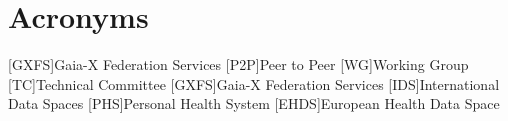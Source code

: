 \chapter{Acronyms}
\begin{acronym}
    [GXFS]{Gaia-X Federation Services}
    [P2P]{Peer to Peer}
    [WG]{Working Group}
    [TC]{Technical Committee}
    [GXFS]{Gaia-X Federation Services}
    [IDS]{International Data Spaces}
    [PHS]{Personal Health System}
    [EHDS]{European Health Data Space}
\end{acronym}
